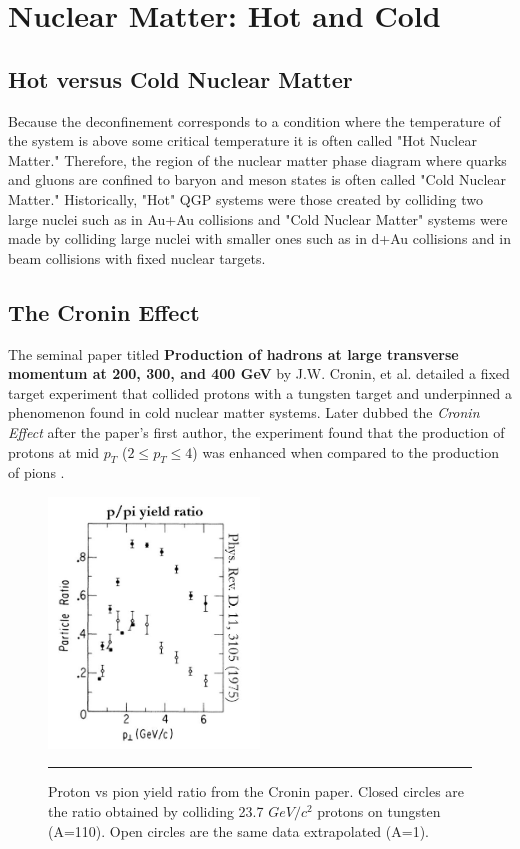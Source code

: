 

\chapter{Nuclear Matter: Hot and Cold} %
\section{Hot versus Cold Nuclear Matter}
Because the deconfinement corresponds to a condition where the temperature of the system is above some critical temperature it is often called "Hot Nuclear Matter." Therefore, the region of the nuclear matter phase diagram where quarks and gluons are confined to baryon and meson states is often called "Cold Nuclear Matter." Historically, "Hot" QGP systems were those created by colliding two large nuclei such as in Au+Au collisions and "Cold Nuclear Matter" systems were made by colliding large nuclei with smaller ones such as in d+Au collisions and in beam collisions with fixed nuclear targets. 

\section{The Cronin Effect}
The seminal paper titled \textbf{Production of hadrons at large transverse momentum at 200, 300, and 400 GeV} by J.W. Cronin, et al. detailed a fixed target experiment that collided protons with a tungsten target and underpinned a phenomenon found in cold nuclear matter systems. Later dubbed the \textit{Cronin Effect} after the paper's first author, the experiment found that the production of protons at mid $p_{T}$ ($2\leq p_{T} \leq 4$) was enhanced when compared to the production of pions \citep{croninpaper}. 
\begin{figure}[htbp!]
  \centering
    \includegraphics[width=0.5\textwidth]{prevplots/croninratio.JPG}
    \rule{35em}{0.5pt}
  \caption[Proton vs pion yield ratio from the Cronin paper]{Proton vs pion yield ratio from the Cronin paper. Closed circles are the ratio obtained by colliding 23.7 $GeV/c^{2}$ protons on tungsten (A=110). Open circles are the same data extrapolated (A=1).}
  \label{fig:croninratio}
\end{figure}

